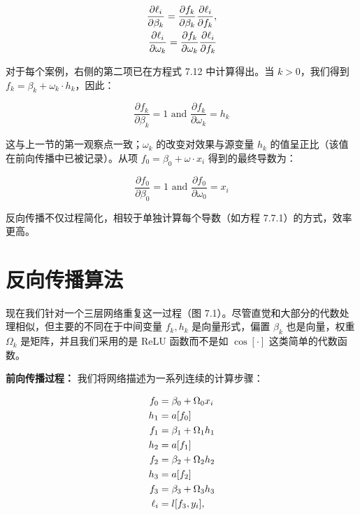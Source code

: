 \documentclass[lang=cn,newtx,10pt,scheme=chinese]{elegantbook}
\begin{document}
\begin{align}
\frac{\partial \ell_i}{\partial \beta_k} = \frac{\partial f_k}{\partial \beta_k} \frac{\partial \ell_i}{\partial f_k}, \notag \\
\frac{\partial \ell_i}{\partial \omega_k} = \frac{\partial f_k}{\partial \omega_k} \frac{\partial \ell_i}{\partial f_k} 
\end{align}

对于每个案例，右侧的第二项已在方程式 7.12 中计算得出。当 \(k > 0\)，我们得到 \(f_k = \beta_k + \omega_k \cdot h_k\)，因此：

\begin{equation}
\frac{\partial f_k}{\partial \beta_k} = 1 \text{ and } \frac{\partial f_k}{\partial \omega_k} = h_k 
\end{equation}


这与上一节的第一观察点一致；\(\omega_k\) 的改变对效果与源变量 \(h_k\) 的值呈正比（该值在前向传播中已被记录）。从项 \(f_0 = \beta_0 + \omega \cdot x_i\) 得到的最终导数为：

\begin{equation}
\frac{\partial f_0}{\partial \beta_0} = 1 \text{ and } \frac{\partial f_0}{\partial \omega_0} = x_i 
\end{equation}

反向传播不仅过程简化，相较于单独计算每个导数（如方程 7.7.1）的方式，效率更高。

\section{反向传播算法}
现在我们针对一个三层网络重复这一过程（图 7.1）。尽管直觉和大部分的代数处理相似，但主要的不同在于中间变量 \(f_k, h_k\) 是向量形式，偏置 \(\beta_k\) 也是向量，权重 \(\Omega_k\) 是矩阵，并且我们采用的是 ReLU 函数而不是如 \(\cos[\cdot]\) 这类简单的代数函数。

\textbf{前向传播过程：} 我们将网络描述为一系列连续的计算步骤：

\begin{align}
f_0 &= \beta_0 + \Omega_0x_i \notag \\
h_1 &= a[f_0] \notag \\
f_1 &= \beta_1 + \Omega_1h_1 \notag \\
h_2 &= a[f_1] \notag \\
f_2 &= \beta_2 + \Omega_2h_2 \notag \\
h_3 &= a[f_2] \notag \\
f_3 &= \beta_3 + \Omega_3h_3 \notag \\
\ell_i &= l[f_3, y_i], 
\end{align} 
\end{document}
